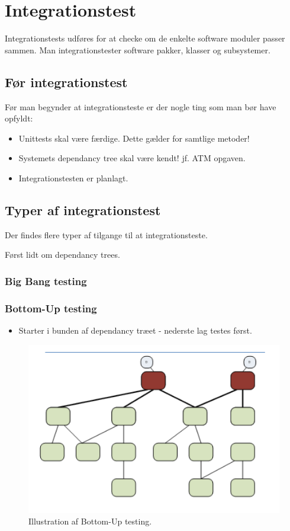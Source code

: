 \section{Integrationstest}
Integrationstests udføres for at checke om de enkelte software moduler passer sammen. Man integrationstester software pakker, klasser og subsystemer.

\subsection{Før integrationstest}
Før man begynder at integrationsteste er der nogle ting som man bør have opfyldt:
\begin{itemize}
	\item Unittests skal være færdige. Dette gælder for samtlige metoder!
	\item Systemets dependancy tree skal være kendt! jf. ATM opgaven.
	\item Integrationstesten er planlagt.
\end{itemize}

\subsection{Typer af integrationstest}
Der findes flere typer af tilgange til at integrationsteste.

Først lidt om dependancy trees. 

\subsubsection{Big Bang testing}

\subsubsection{Bottom-Up testing}

\begin{itemize}
	\item Starter i bunden af dependancy træet - nederste lag testes først.
\end{itemize}

\begin{figure}
\centering
\includegraphics[width=0.7\linewidth]{figs/bottomUp.PNG}
\caption{Illustration af Bottom-Up testing.}
\label{fig:bottomUp}
\end{figure}

